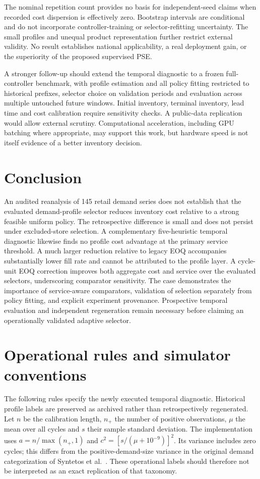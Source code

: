 \documentclass[preprint,12pt]{elsarticle}
\begin{document}
The nominal repetition count provides no basis for independent-seed claims when recorded cost dispersion is effectively zero. Bootstrap intervals are conditional and do not incorporate controller-training or selector-refitting uncertainty. The small profiles and unequal product representation further restrict external validity. No result establishes national applicability, a real deployment gain, or the superiority of the proposed supervised PSE.

A stronger follow-up should extend the temporal diagnostic to a frozen full-controller benchmark, with profile estimation and all policy fitting restricted to historical prefixes, selector choice on validation periods and evaluation across multiple untouched future windows. Initial inventory, terminal inventory, lead time and cost calibration require sensitivity checks. A public-data replication would allow external scrutiny. Computational acceleration, including GPU batching where appropriate, may support this work, but hardware speed is not itself evidence of a better inventory decision.

\section{Conclusion}
An audited reanalysis of 145 retail demand series does not establish that the evaluated demand-profile selector reduces inventory cost relative to a strong feasible uniform policy. The retrospective difference is small and does not persist under excluded-store selection. A complementary five-heuristic temporal diagnostic likewise finds no profile cost advantage at the primary service threshold. A much larger reduction relative to legacy EOQ accompanies substantially lower fill rate and cannot be attributed to the profile layer. A cycle-unit EOQ correction improves both aggregate cost and service over the evaluated selectors, underscoring comparator sensitivity. The case demonstrates the importance of service-aware comparators, validation of selection separately from policy fitting, and explicit experiment provenance. Prospective temporal evaluation and independent regeneration remain necessary before claiming an operationally validated adaptive selector.

\appendix
\section{Operational rules and simulator conventions}
\label{app:rules}
The following rules specify the newly executed temporal diagnostic. Historical profile labels are preserved as archived rather than retrospectively regenerated. Let $n$ be the calibration length, $n_+$ the number of positive observations, $\mu$ the mean over all cycles and $s$ their sample standard deviation. The implementation uses $a=n/\max(n_+,1)$ and $c^2=[s/(\mu+10^{-9})]^2$. Its variance includes zero cycles; this differs from the positive-demand-size variance in the original demand categorization of Syntetos et al.\ \cite{syntetos2005}. These operational labels should therefore not be interpreted as an exact replication of that taxonomy.
\end{document}
